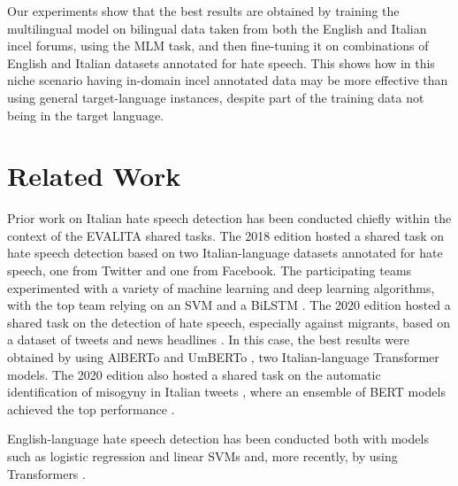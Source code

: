 \documentclass[11pt]{article}
\newcommand{\todoP}[1]{\todo[color=red]{P: #1}}
\begin{document}
Our experiments show that the best results are obtained by training the multilingual model on bilingual data taken from both the English and Italian incel forums, using the MLM task, and then fine-tuning it on combinations of English and Italian datasets annotated for hate speech. This shows how in this niche scenario having in-domain incel annotated data may be more effective than using general target-language instances, despite part of the training data not being in the target language.


\section{Related Work}

Prior work on Italian hate speech detection has been conducted chiefly within the context of the EVALITA shared tasks. The 2018 edition hosted a shared task on hate speech detection \cite{boscoOverviewEVALITA2018} based on two Italian-language datasets annotated for hate speech, one from Twitter and one from Facebook. The participating teams experimented with a variety of machine learning and deep learning algorithms, with the top team relying on an SVM and a BiLSTM \cite{cimino2018multi}. The 2020 edition hosted a shared task on the detection of hate speech, especially against migrants, based on a dataset of tweets and news headlines \cite{basileEVALITA2020Overview}. In this case, the best results were obtained by using AlBERTo \cite{PolignanoEtAlCLIC2019} and UmBERTo \cite{musixmatch-2020-umberto}, two Italian-language Transformer models. The 2020 edition also hosted a shared task on the automatic identification of misogyny in Italian tweets \cite{fersiniAMIEVALITA2020Automatic2020}, where an ensemble of BERT models achieved the top performance \cite{mutiUniBOAMIMultiClass2020}.

English-language hate speech detection has been conducted both with models such as logistic regression and linear SVMs \cite{davidson-2017-automated-hate} and, more recently, by using Transformers \cite{mathew2021hatexplain}.
\end{document}
